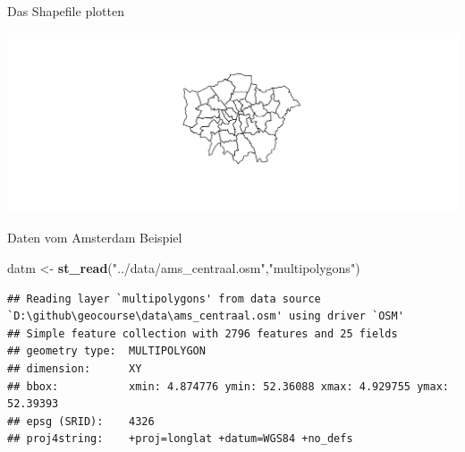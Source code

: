 \documentclass[ignorenonframetext,]{beamer}
\newenvironment{Shaded}{\begin{snugshade}}{\end{snugshade}}
\newcommand{\KeywordTok}[1]{\textcolor[rgb]{0.13,0.29,0.53}{\textbf{#1}}}
\newcommand{\NormalTok}[1]{#1}
\newcommand{\OperatorTok}[1]{\textcolor[rgb]{0.81,0.36,0.00}{\textbf{#1}}}
\newcommand{\StringTok}[1]{\textcolor[rgb]{0.31,0.60,0.02}{#1}}
\begin{document}
\begin{frame}[fragile]{Das Shapefile plotten}
\protect\hypertarget{das-shapefile-plotten}{}

\begin{Shaded}
\end{Shaded}

\includegraphics{simplefeatures_files/figure-beamer/unnamed-chunk-18-1.pdf}

\end{frame}

\begin{frame}[fragile]{Daten vom Amsterdam Beispiel}
\protect\hypertarget{daten-vom-amsterdam-beispiel}{}

\begin{Shaded}
\begin{Highlighting}[]
\NormalTok{datm <-}\StringTok{ }\KeywordTok{st_read}\NormalTok{(}\StringTok{"../data/ams_centraal.osm"}\NormalTok{,}\StringTok{"multipolygons"}\NormalTok{)}
\end{Highlighting}
\end{Shaded}

\begin{verbatim}
## Reading layer `multipolygons' from data source `D:\github\geocourse\data\ams_centraal.osm' using driver `OSM'
## Simple feature collection with 2796 features and 25 fields
## geometry type:  MULTIPOLYGON
## dimension:      XY
## bbox:           xmin: 4.874776 ymin: 52.36088 xmax: 4.929755 ymax: 52.39393
## epsg (SRID):    4326
## proj4string:    +proj=longlat +datum=WGS84 +no_defs
\end{verbatim}

\end{frame}
\end{document}
